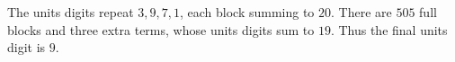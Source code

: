 The units digits repeat $3,9,7,1$, each block summing to $20$. There are $505$ full blocks and three extra terms, whose units digits sum to $19$. Thus the final units digit is $\boxed9$.
